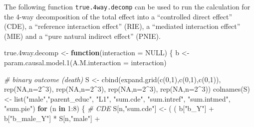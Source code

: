 \documentclass[
]{book}
\newenvironment{Shaded}{\begin{snugshade}}{\end{snugshade}}
\newcommand{\AttributeTok}[1]{\textcolor[rgb]{0.77,0.63,0.00}{#1}}
\newcommand{\CommentTok}[1]{\textcolor[rgb]{0.56,0.35,0.01}{\textit{#1}}}
\newcommand{\ConstantTok}[1]{\textcolor[rgb]{0.00,0.00,0.00}{#1}}
\newcommand{\ControlFlowTok}[1]{\textcolor[rgb]{0.13,0.29,0.53}{\textbf{#1}}}
\newcommand{\DecValTok}[1]{\textcolor[rgb]{0.00,0.00,0.81}{#1}}
\newcommand{\FloatTok}[1]{\textcolor[rgb]{0.00,0.00,0.81}{#1}}
\newcommand{\FunctionTok}[1]{\textcolor[rgb]{0.00,0.00,0.00}{#1}}
\newcommand{\NormalTok}[1]{#1}
\newcommand{\OtherTok}[1]{\textcolor[rgb]{0.56,0.35,0.01}{#1}}
\newcommand{\SpecialCharTok}[1]{\textcolor[rgb]{0.00,0.00,0.00}{#1}}
\newcommand{\StringTok}[1]{\textcolor[rgb]{0.31,0.60,0.02}{#1}}
\begin{document}
The following function \texttt{true.4way.decomp} can be used to run the calculation for the 4-way decomposition of the total effect into a ``controlled direct effect'' (CDE), a ``reference interaction effect'' (RIE), a ``mediated interaction effect'' (MIE) and a ``pure natural indirect effect'' (PNIE).

\begin{Shaded}
\begin{Highlighting}[]
\NormalTok{true}\FloatTok{.4}\NormalTok{way.decomp }\OtherTok{\textless{}{-}} \ControlFlowTok{function}\NormalTok{(}\AttributeTok{interaction =} \ConstantTok{NULL}\NormalTok{) \{}
\NormalTok{  b }\OtherTok{\textless{}{-}} \FunctionTok{param.causal.model.1}\NormalTok{(}\AttributeTok{A.M.interaction =}\NormalTok{ interaction)}
  
  \CommentTok{\# binary outcome (death)}
\NormalTok{  S }\OtherTok{\textless{}{-}} \FunctionTok{cbind}\NormalTok{(}\FunctionTok{expand.grid}\NormalTok{(}\FunctionTok{c}\NormalTok{(}\DecValTok{0}\NormalTok{,}\DecValTok{1}\NormalTok{),}\FunctionTok{c}\NormalTok{(}\DecValTok{0}\NormalTok{,}\DecValTok{1}\NormalTok{),}\FunctionTok{c}\NormalTok{(}\DecValTok{0}\NormalTok{,}\DecValTok{1}\NormalTok{)), }\FunctionTok{rep}\NormalTok{(}\ConstantTok{NA}\NormalTok{,}\AttributeTok{n=}\DecValTok{2}\SpecialCharTok{\^{}}\DecValTok{3}\NormalTok{), }\FunctionTok{rep}\NormalTok{(}\ConstantTok{NA}\NormalTok{,}\AttributeTok{n=}\DecValTok{2}\SpecialCharTok{\^{}}\DecValTok{3}\NormalTok{), }
             \FunctionTok{rep}\NormalTok{(}\ConstantTok{NA}\NormalTok{,}\AttributeTok{n=}\DecValTok{2}\SpecialCharTok{\^{}}\DecValTok{3}\NormalTok{), }\FunctionTok{rep}\NormalTok{(}\ConstantTok{NA}\NormalTok{,}\AttributeTok{n=}\DecValTok{2}\SpecialCharTok{\^{}}\DecValTok{3}\NormalTok{))}
  \FunctionTok{colnames}\NormalTok{(S) }\OtherTok{\textless{}{-}} \FunctionTok{list}\NormalTok{(}\StringTok{"male"}\NormalTok{,}\StringTok{"parent\_educ"}\NormalTok{, }\StringTok{"L1"}\NormalTok{, }\StringTok{"sum.cde"}\NormalTok{, }\StringTok{"sum.intref"}\NormalTok{, }
                      \StringTok{"sum.intmed"}\NormalTok{, }\StringTok{"sum.pie"}\NormalTok{)}
  \ControlFlowTok{for}\NormalTok{ (n }\ControlFlowTok{in} \DecValTok{1}\SpecialCharTok{:}\DecValTok{8}\NormalTok{) \{}
    \CommentTok{\# CDE }
\NormalTok{    S[n,}\StringTok{"sum.cde"}\NormalTok{] }\OtherTok{\textless{}{-}}\NormalTok{ ( ( b[}\StringTok{"b\_Y"}\NormalTok{] }\SpecialCharTok{+} 
\NormalTok{                            b[}\StringTok{"b\_male\_Y"}\NormalTok{] }\SpecialCharTok{*}\NormalTok{ S[n,}\StringTok{"male"}\NormalTok{] }\SpecialCharTok{+} 

\end{Highlighting}
\end{Shaded}
\end{document}
